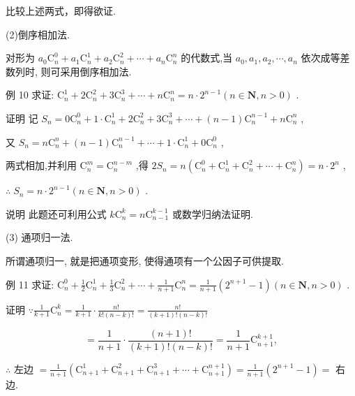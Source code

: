 \documentclass[10pt]{article}
\begin{document}
比较上述两式，即得欲证.

(2)倒序相加法.

对形为 \({a}_{0}{\mathrm{C}}_{n}^{0} + {a}_{1}{\mathrm{C}}_{n}^{1} + {a}_{2}{\mathrm{C}}_{n}^{2} + \cdots  + {a}_{n}{\mathrm{C}}_{n}^{n}\) 的代数式,当 \({a}_{0},{a}_{1},{a}_{2},\cdots ,{a}_{n}\) 依次成等差数列时, 则可采用倒序相加法.

例 10 求证: \({\mathrm{C}}_{n}^{1} + 2{\mathrm{C}}_{n}^{2} + 3{\mathrm{C}}_{n}^{3} + \cdots  + n{\mathrm{C}}_{n}^{n} = n \cdot  {2}^{n - 1}\left( {n \in  \mathbf{N},n > 0}\right)\) .

证明 记 \({S}_{n} = 0{\mathrm{C}}_{n}^{0} + 1 \cdot  {\mathrm{C}}_{n}^{1} + 2{\mathrm{C}}_{n}^{2} + 3{\mathrm{C}}_{n}^{3} + \cdots  + \left( {n - 1}\right) {\mathrm{C}}_{n}^{n - 1} + n{\mathrm{C}}_{n}^{n}\) ,

又 \({S}_{n} = n{\mathrm{C}}_{n}^{n} + \left( {n - 1}\right) {\mathrm{C}}_{n}^{n - 1} + \cdots  + 1 \cdot  {\mathrm{C}}_{n}^{1} + 0{\mathrm{C}}_{n}^{0}\) ,

两式相加,并利用 \({\mathrm{C}}_{n}^{m} = {\mathrm{C}}_{n}^{n - m}\) ,得 \(2{S}_{n} = n\left( {{\mathrm{C}}_{n}^{0} + {\mathrm{C}}_{n}^{1} + {\mathrm{C}}_{n}^{2} + \cdots  + {\mathrm{C}}_{n}^{n}}\right)  = n \cdot  {2}^{n}\) ,

\(\therefore \;{S}_{n} = n \cdot  {2}^{n - 1}\left( {n \in  \mathbf{N},n > 0}\right)\) .

说明 此题还可利用公式 \(k{\mathrm{C}}_{n}^{k} = n{\mathrm{C}}_{n - 1}^{k - 1}\) 或数学归纳法证明.

(3) 通项归一法.

所谓通项归一, 就是把通项变形, 使得通项有一个公因子可供提取.

例 11 求证: \({\mathrm{C}}_{n}^{0} + \frac{1}{2}{\mathrm{C}}_{n}^{1} + \frac{1}{3}{\mathrm{C}}_{n}^{2} + \cdots  + \frac{1}{n + 1}{\mathrm{C}}_{n}^{n} = \frac{1}{n + 1}\left( {{2}^{n + 1} - 1}\right) \left( {n \in  \mathbf{N},n > 0}\right)\) .

证明 \(\because \frac{1}{k + 1}{\mathrm{C}}_{n}^{k} = \frac{1}{k + 1} \cdot  \frac{n!}{k!\left( {n - k}\right) !} = \frac{n!}{\left( {k + 1}\right) !\left( {n - k}\right) !}\)

\[
= \frac{1}{n + 1} \cdot  \frac{\left( {n + 1}\right) !}{\left( {k + 1}\right) !\left( {n - k}\right) !} = \frac{1}{n + 1}{\mathrm{C}}_{n + 1}^{k + 1},
\]

\(\therefore\) 左边 \(= \frac{1}{n + 1}\left( {{\mathrm{C}}_{n + 1}^{1} + {\mathrm{C}}_{n + 1}^{2} + {\mathrm{C}}_{n + 1}^{3} + \cdots  + {\mathrm{C}}_{n + 1}^{n + 1}}\right)  = \frac{1}{n + 1}\left( {{2}^{n + 1} - 1}\right)  =\) 右边.
\end{document}
